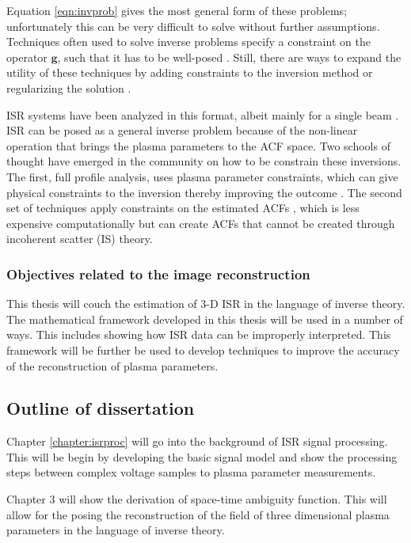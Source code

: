 Equation \ref{eqn:invprob} gives the most general form of these problems; unfortunately this can be very difficult to solve without further assumptions. Techniques often used to solve inverse problems specify a constraint on the operator $\mathbf{g}$, such that it has to be well-posed \cite{0266-5611-4-4-010}. Still, there are ways to expand the utility of these techniques by adding constraints to the inversion method or regularizing the solution \cite{Vogel:2002:CMI:581830,Karl:2005jy}.

ISR systems have been analyzed in this format, albeit mainly for a single beam \cite{Vierinen:2012ve}. ISR can be posed as a general inverse problem because of the non-linear operation that brings the plasma parameters to the ACF space. Two schools of thought have emerged in the community on how to be constrain these inversions. The first, full profile analysis, uses plasma parameter constraints, which can give physical constraints to the inversion thereby improving the outcome \cite{hysell2008,RDS:RDS3308}. The second set of techniques apply constraints on the estimated ACFs \cite{Virtanen:20082vx,nikoukar2008}, which is less expensive computationally but can create ACFs that cannot be created through incoherent scatter (IS) theory.

\subsubsection{Objectives related to the image reconstruction}
This thesis will couch the estimation of 3-D ISR in the language of inverse theory. The mathematical framework developed in this thesis will be used in a number of ways. This includes showing how ISR data can be improperly interpreted. This framework will be further be used to develop techniques to improve the accuracy of the reconstruction of plasma parameters.

\subsection{Outline of dissertation}

Chapter \ref{chapter:isrproc} will go into the background of ISR signal processing. This will be begin by developing the basic signal model and show the processing steps between complex voltage samples to plasma parameter measurements.

Chapter 3 will show the derivation of space-time ambiguity function. This will allow for the posing the reconstruction of the field of three dimensional plasma parameters in the language of inverse theory. 

